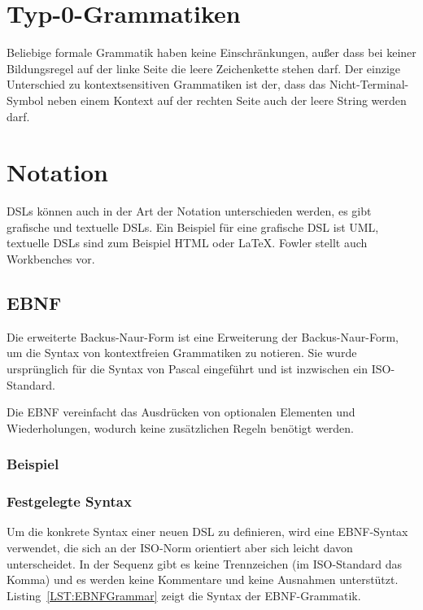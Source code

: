 \documentclass[../InterneDSLs.tex]{subfiles}
\begin{document}
\section{Typ-0-Grammatiken}\label{sec:beliebigegrammatik}
Beliebige formale Grammatik haben keine Einschränkungen, außer dass bei keiner Bildungsregel auf der linke Seite die leere Zeichenkette stehen darf. Der einzige Unterschied zu kontextsensitiven Grammatiken ist der, dass das Nicht-Terminal-Symbol neben einem Kontext auf der rechten Seite auch der leere String werden darf.


\section{Notation}\label{SEC:Notation}
DSLs können auch in der Art der Notation unterschieden werden, es gibt grafische und textuelle DSLs. Ein Beispiel für eine grafische DSL ist UML, textuelle DSLs sind zum Beispiel HTML oder LaTeX. Fowler stellt auch Workbenches vor.\cite[S. 22ff]{Fowler.2010}

\subsection{EBNF}
Die erweiterte Backus-Naur-Form ist eine Erweiterung der Backus-Naur-Form, um die Syntax von kontextfreien Grammatiken zu notieren. Sie wurde ursprünglich für die Syntax von Pascal eingeführt und ist inzwischen ein ISO-Standard\cite{scowen1996international}.

Die EBNF vereinfacht das Ausdrücken von optionalen Elementen und Wiederholungen, wodurch keine zusätzlichen Regeln benötigt werden.

\subsubsection{Beispiel}

\subsubsection{Festgelegte Syntax}
Um die konkrete Syntax einer neuen DSL zu definieren, wird eine EBNF-Syntax verwendet, die sich an der ISO-Norm orientiert aber sich leicht davon unterscheidet. In der Sequenz gibt es keine Trennzeichen (im ISO-Standard das Komma) und es werden keine Kommentare und keine Ausnahmen unterstützt. Listing~\ref{LST:EBNFGrammar} zeigt die Syntax der EBNF-Grammatik.

\begin{figure}[ht]

\end{figure}
\end{document}
